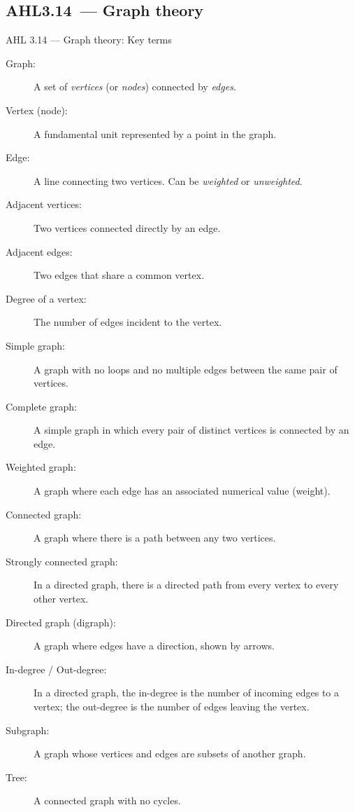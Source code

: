 \documentclass[11pt]{article}
\def\textbf#1{#1}%
\newcommand{\tocsubsection}[1]{\subsection{#1}}
\begin{document}
\tocsubsection{AHL3.14 — Graph theory}
\textbf{AHL 3.14 — Graph theory: Key terms}

\begin{description}
  \item[Graph:] A set of \emph{vertices} (or \emph{nodes}) connected by \emph{edges}.
  \item[Vertex (node):] A fundamental unit represented by a point in the graph.
  \item[Edge:] A line connecting two vertices. Can be \emph{weighted} or \emph{unweighted}.
  \item[Adjacent vertices:] Two vertices connected directly by an edge.
  \item[Adjacent edges:] Two edges that share a common vertex.
  \item[Degree of a vertex:] The number of edges incident to the vertex.
  \item[Simple graph:] A graph with no loops and no multiple edges between the same pair of vertices.
  \item[Complete graph:] A simple graph in which every pair of distinct vertices is connected by an edge.
  \item[Weighted graph:] A graph where each edge has an associated numerical value (weight).
  \item[Connected graph:] A graph where there is a path between any two vertices.
  \item[Strongly connected graph:] In a directed graph, there is a directed path from every vertex to every other vertex.
  \item[Directed graph (digraph):] A graph where edges have a direction, shown by arrows.
  \item[In-degree / Out-degree:] In a directed graph, the in-degree is the number of incoming edges to a vertex; the out-degree is the number of edges leaving the vertex.
  \item[Subgraph:] A graph whose vertices and edges are subsets of another graph.
  \item[Tree:] A connected graph with no cycles.
\end{description}
\end{document}
